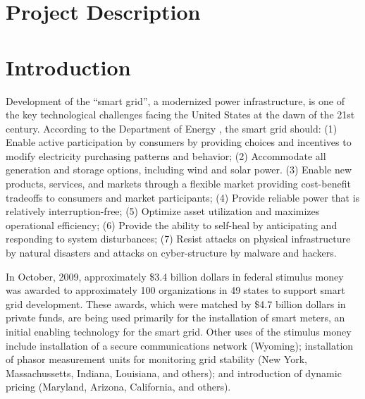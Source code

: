 
\renewcommand{\thepage} {C--\arabic{page}}

\renewcommand{\thesection} {C.\arabic{section}}
\setcounter{section}{0}

\section{Project Description}

\section{Introduction}

Development of the ``smart grid'', a modernized power infrastructure, is
one of the key technological challenges facing the United States at the
dawn of the 21st century. According to the Department of Energy \cite{doe}, the smart
grid should: (1) Enable active participation by consumers by providing
choices and incentives to modify electricity purchasing patterns and
behavior; (2) Accommodate all generation and storage options, including
wind and solar power.  (3) Enable new products, services, and markets
through a flexible market providing cost-benefit tradeoffs to consumers
and market participants; (4) Provide reliable power that is relatively
interruption-free; (5) Optimize asset utilization and maximizes operational
efficiency; (6) Provide the ability to self-heal by anticipating and
responding to system disturbances; (7) Resist attacks on physical
infrastructure by natural disasters and attacks on cyber-structure by
malware and hackers.

In October, 2009, approximately \$3.4 billion dollars in federal stimulus
money was awarded to approximately 100 organizations in 49 states to
support smart grid development.  These awards, which were matched by \$4.7
billion dollars in private funds, are being used primarily for the
installation of smart meters, an initial enabling technology for the smart grid.
Other uses of the stimulus money include installation of a secure
communications network (Wyoming); installation of phasor measurement units
for monitoring grid stability (New York, Massachussetts, Indiana,
Louisiana, and others); and introduction of dynamic pricing (Maryland,
Arizona, California, and others).


